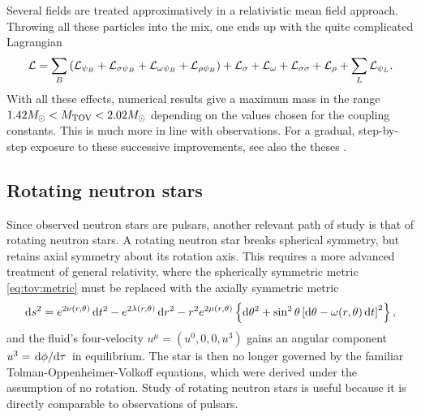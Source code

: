 Several fields are treated approximatively in a relativistic mean field approach.
Throwing all these particles into the mix, one ends up with the quite complicated Lagrangian
\begin{equation}
\begin{split}
	\mathcal{L} &= \sum_B \left( \mathcal{L}_{\psi_B} + \mathcal{L}_{\sigma \psi_{B}} + \mathcal{L}_{\omega \psi_{B}} + \mathcal{L}_{\rho \psi_{B}} \right) + \mathcal{L}_\sigma + \mathcal{L}_\omega + \mathcal{L}_{\sigma \sigma} + \mathcal{L}_\rho + \sum_L \mathcal{L}_{\psi_L} . \\
\end{split}
\end{equation}
With all these effects, numerical results give a maximum mass in the range $1.42 M_\odot < M_\text{TOV} < 2.02 M_\odot$ depending on the values chosen for the coupling constants. \cite[table 1]{ref:neutron_star_hyperon_effect}
This is much more in line with observations.
For a gradual, step-by-step exposure to these successive improvements, see also the theses \cite{ref:master_caroline,ref:master_francesco}.

\subsection*{Rotating neutron stars}

Since observed neutron stars are pulsars, another relevant path of study is that of rotating neutron stars.
A rotating neutron star breaks spherical symmetry, but retains axial symmetry about its rotation axis.
This requires a more advanced treatment of general relativity, where the spherically symmetric metric \eqref{eq:tov:metric} must be replaced with the axially symmetric metric
\cite[section 6]{ref:glendenning}
\begin{equation}
	\mathop{}\!\mathrm{d} s^2 = e^{2\nu(r,\theta)} \mathop{}\!\mathrm{d} t^2 - e^{2\lambda(r,\theta)} \mathop{}\!\mathrm{d} r^2 - r^2 e^{2 \mu(r,\theta)} \left\{ \mathop{}\!\mathrm{d} \theta^2 + \sin^2 \theta \left[ \mathop{}\!\mathrm{d} \theta  - \omega(r,\theta) \mathop{}\!\mathrm{d} t \right]^2 \right\} ,
\end{equation}
and the fluid's four-velocity $u^\mu = (u^0, 0, 0, u^3)$ gains an angular component $u^3 = \odv{\phi}/{\tau}$ in equilibrium.
The star is then no longer governed by the familiar Tolman-Oppenheimer-Volkoff equations, which were derived under the assumption of no rotation.
Study of rotating neutron stars is useful because it is directly comparable to observations of pulsars.

